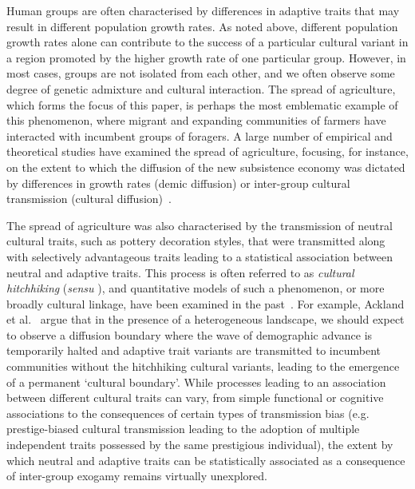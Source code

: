 \documentclass[9pt,twocolumn,twoside,lineno]{pnas-new}
\begin{document}
Human groups are often characterised by differences in adaptive traits that may result in different population growth rates. 
As noted above, different population growth rates alone can contribute to the success of a particular cultural variant in a region promoted by the higher growth rate of one particular group. However, in most cases, groups are not isolated from each other, and we often observe some degree of genetic admixture and cultural interaction. 
The spread of agriculture, which forms the focus of this paper, is perhaps the most emblematic example of this phenomenon, where migrant and expanding communities of farmers have interacted with incumbent groups of foragers.
A large number of empirical and theoretical studies have examined the spread of agriculture, focusing, for instance, on the extent to which the diffusion of the new subsistence economy was dictated by differences in growth rates (demic diffusion) or inter-group cultural transmission (cultural diffusion)~\citep{ammerman_neolithic_1984,fort_synthesis_2012,fort2022prehistoric,fort_prehistoric_2022}. 

The spread of agriculture was also characterised by the transmission of neutral cultural traits, such as pottery decoration styles, that were transmitted along with selectively advantageous traits leading to a statistical association between neutral and adaptive traits. 
This process is often referred to as \emph{cultural hitchhiking} (\textit{sensu} \citep{ackland_cultural_2007}), and 
quantitative models of such a phenomenon, or more broadly cultural linkage, have been examined in the past~\citep{ackland_cultural_2007,premo_hitchhikers_2012,yeh_cultural_2019,pardo-gordo_cultural_2021}. 
{\color{red}For example, Ackland et al.~\citep{ackland_cultural_2007} argue that in the presence of a heterogeneous landscape, we should expect to observe a diffusion boundary where the wave of demographic advance is temporarily halted and adaptive trait variants are transmitted to incumbent communities without the hitchhiking cultural variants, leading to the emergence of a permanent `cultural boundary'. 
While processes leading to an association between different cultural traits can vary, from simple functional or cognitive associations to the consequences of certain types of transmission bias (e.g. prestige-biased cultural transmission leading to the adoption of multiple independent traits possessed by the same prestigious individual), the extent by which neutral and adaptive traits can be statistically associated as a consequence of inter-group exogamy remains virtually unexplored.}  
\end{document}

